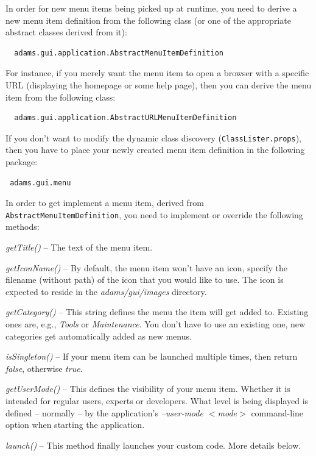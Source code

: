 In order for new menu items being picked up at runtime, you need to derive a
new menu item definition from the following class (or one of the appropriate
abstract classes derived from it):
\begin{verbatim}
  adams.gui.application.AbstractMenuItemDefinition
\end{verbatim}
For instance, if you merely want the menu item to open a browser with a specific
URL (displaying the homepage or some help page), then you can derive the menu
item from the following class:
\begin{verbatim}
  adams.gui.application.AbstractURLMenuItemDefinition
\end{verbatim}
If you don't want to modify the dynamic class discovery
(\texttt{ClassLister.props}), then you have to place your newly created menu
item definition in the following package:
\begin{verbatim}
 adams.gui.menu
\end{verbatim}
In order to get implement a menu item, derived from
\texttt{AbstractMenuItemDefinition}, you need to implement or override the
following methods:
\begin{tight_itemize}
	\item \textit{getTitle()} -- The text of the menu item.
	\item \textit{getIconName()} -- By default, the menu item won't have an icon,
	specify the filename (without path) of the icon that you would like to use. The
	icon is expected to reside in the \textit{adams/gui/images} directory.
	\item \textit{getCategory()} -- This string defines the menu the item will get
	added to. Existing ones are, e.g., \textit{Tools} or \textit{Maintenance}. You
	don't have to use an existing one, new categories get automatically added as
	new menus.
	\item \textit{isSingleton()} -- If your menu item can be launched multiple
	times, then return \textit{false}, otherwise \textit{true}.
	\item \textit{getUserMode()} -- This defines the visibility of your menu item.
	Whether it is intended for regular users, experts or developers. What level is
	being displayed is defined -- normally -- by the application's
	\textit{--user-mode $<$mode$>$} command-line option when starting the
	application.
	\item \textit{launch()} -- This method finally launches your custom code. More
	details below.
\end{tight_itemize}

